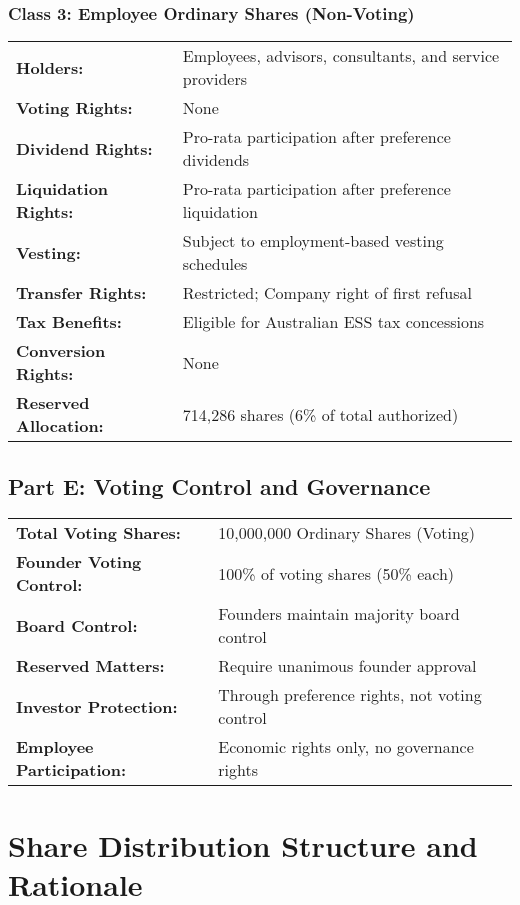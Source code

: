 \vspace{1em}

\subsubsection*{Class 3: Employee Ordinary Shares (Non-Voting)}
\begin{tabularx}{\textwidth}{@{} l X @{}}
\textbf{Holders:} & Employees, advisors, consultants, and service providers \\
\textbf{Voting Rights:} & None \\
\textbf{Dividend Rights:} & Pro-rata participation after preference dividends \\
\textbf{Liquidation Rights:} & Pro-rata participation after preference liquidation \\
\textbf{Vesting:} & Subject to employment-based vesting schedules \\
\textbf{Transfer Rights:} & Restricted; Company right of first refusal \\
\textbf{Tax Benefits:} & Eligible for Australian ESS tax concessions \\
\textbf{Conversion Rights:} & None \\
\textbf{Reserved Allocation:} & 714,286 shares (6\% of total authorized)
\end{tabularx}

\vspace{1em}

\subsection*{Part E: Voting Control and Governance}
\begin{tabularx}{\textwidth}{@{} l X @{}}
\textbf{Total Voting Shares:} & 10,000,000 Ordinary Shares (Voting) \\
\textbf{Founder Voting Control:} & 100\% of voting shares (50\% each) \\
\textbf{Board Control:} & Founders maintain majority board control \\
\textbf{Reserved Matters:} & Require unanimous founder approval \\
\textbf{Investor Protection:} & Through preference rights, not voting control \\
\textbf{Employee Participation:} & Economic rights only, no governance rights
\end{tabularx}

\section*{Share Distribution Structure and Rationale}

